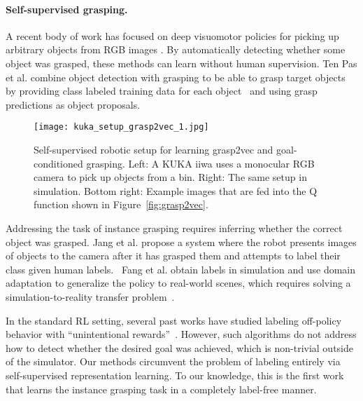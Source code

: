 \documentclass{article}
\begin{document}
\vspace{-0.1in}
\paragraph{Self-supervised grasping.}

A recent body of work has focused on deep visuomotor policies for picking up arbitrary objects from RGB images \cite{pinto2016supersizing, levine2016learning, lenz2015deep,zeng2017multi}.
By automatically detecting whether some object was grasped, these methods can learn without human supervision.
Ten Pas et al. combine object detection with grasping to be able to grasp target objects by providing class labeled training data for each object~\cite{ten2017grasp} and using grasp predictions as object proposals.
\begin{wrapfigure}{r}{0.4\textwidth}
\vspace{-0.05in}
\begin{center}
\texttt{[image: kuka\_setup\_grasp2vec\_1.jpg]}
\end{center}
\caption{Self-supervised robotic setup for learning grasp2vec and goal-conditioned grasping. Left: A KUKA iiwa uses a monocular RGB camera to pick up objects from a bin. Right: The same setup in simulation. Bottom right: Example images that are fed into the Q function shown in Figure~\ref{fig:grasp2vec}.}
\label{fig:kuka_setup}
\vspace{-0.2in}
\end{wrapfigure}

Addressing the task of instance grasping requires inferring whether the correct object was grasped. Jang et al. propose a system where the robot presents images of objects to the camera after it has grasped them and attempts to label their class given human labels.~\cite{jang2017semantic}
Fang et al. obtain labels in simulation and use domain adaptation to generalize the policy to real-world scenes, which requires solving a simulation-to-reality transfer problem~\cite{fang2017multi}.

 In the standard RL setting, several past works have studied labeling off-policy behavior with ``unintentional rewards''~\cite{hindsight2017,cabi2017intentional}.
However, such algorithms do not address how to detect whether the desired goal was achieved, which is non-trivial outside of the simulator. Our methods circumvent the problem of labeling entirely via self-supervised representation learning. To our knowledge, this is the first work that learns the instance grasping task in a completely label-free manner.
\end{document}
